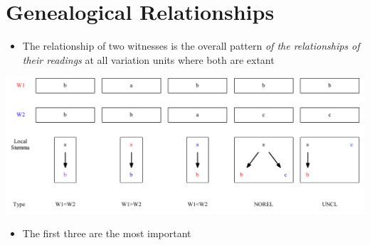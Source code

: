 \documentclass[10pt]{beamer}
\begin{document}
	\section*{Genealogical Relationships}
	\begin{frame}
		\begin{itemize}
			\item The relationship of two witnesses is the overall pattern \emph{of the relationships of their readings} at all variation units where both are extant
		\end{itemize}
		\begin{center}
			\includegraphics[width=\textwidth]{../img/genealogical-relationships.pdf}
		\end{center}
		\begin{itemize}
			\item The first three are the most important
		\end{itemize}
	\end{frame}
\end{document}
